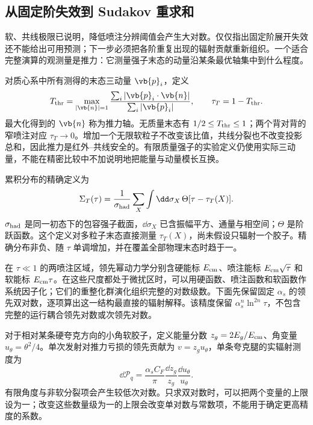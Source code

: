 \subsection{从固定阶失效到 Sudakov 重求和}
\label{sec:qcd-sudakov-thrust-applications}

软、共线极限已说明，降低喷注分辨阈值会产生大对数。仅仅指出固定阶展开失效还不能给出可用预测；下一步必须把各阶重复出现的辐射贡献重新组织。一个适合完整演算的观测量是推力：它测量强子末态的动量沿某条最优轴集中到什么程度。

对质心系中所有测得的末态三动量 $\vb{p}_i$，定义
\begin{equation}
 T_{\rm thr}=\max_{|\vb{n}|=1}
 \frac{\sum_i|\vb{p}_i\cdot\vb{n}|}{\sum_i|\vb{p}_i|},
 \qquad \tau_T=1-T_{\rm thr}.
 \label{eq:qcd-thrust-definition}
\end{equation}
最大化得到的 $\vb{n}$ 称为推力轴。无质量末态有 $1/2\leq T_{\rm thr}\leq1$；两个背对背的窄喷注对应 $\tau_T\to0$。增加一个无限软粒子不改变该比值，共线分裂也不改变投影总和，因此推力是红外--共线安全的。有限质量强子的实验定义仍使用实际三动量，不能在精密比较中不加说明地把能量与动量模长互换。

累积分布的精确定义为
\begin{equation}
 \Sigma_T(\tau)=\frac{1}{\sigma_{\rm had}}
 \sum_X\int\dd\sigma_X\,
 \Theta[\tau-\tau_T(X)].
 \label{eq:qcd-thrust-cumulant}
\end{equation}
$\sigma_{\rm had}$ 是同一初态下的包容强子截面，$\dd\sigma_X$ 已含振幅平方、通量与相空间；$\Theta$ 是阶跃函数。这个定义对多粒子末态直接测量 $\tau_T(X)$，尚未假设只辐射一个胶子。精确分布非负、随 $\tau$ 单调增加，并在覆盖全部物理末态时趋于一。

在 $\tau\ll1$ 的两喷注区域，领先幂动力学分别含硬能标 $E_{\rm cm}$、喷注能标 $E_{\rm cm}\sqrt\tau$ 和软能标 $E_{\rm cm}\tau$。在这些尺度都处于微扰区时，可以用硬函数、喷注函数和软函数作系统因子化；它们的重整化群演化组织完整的对数级数\cite{BecherSchwartz2008Thrust}。下面先保留固定 $\alpha_s$ 的领先双对数，逐项算出这一结构最直接的辐射解释。该精度保留 $\alpha_s^n\ln^{2n}\tau$，不包含完整的运行耦合领先对数或次领先对数。

对于相对某条硬夸克方向的小角软胶子，定义能量分数 $z_g=2E_g/E_{\rm cm}$、角变量 $u_\theta=\theta^2/4$。单次发射对推力亏损的领先贡献为 $v=z_gu_\theta$，单条夸克腿的实辐射测度为
\begin{equation}
 \dd\mathcal P_q=\frac{\alpha_sC_F}{\pi}
 \frac{\dd z_g}{z_g}\frac{\dd u_\theta}{u_\theta}.
 \label{eq:qcd-thrust-emission-measure}
\end{equation}
有限角度与非软分裂项会产生较低次对数。只求双对数时，可以把两个变量的上限设为一；改变这些数量级为一的上限会改变单对数与常数项，不能用于确定更高精度的系数。

